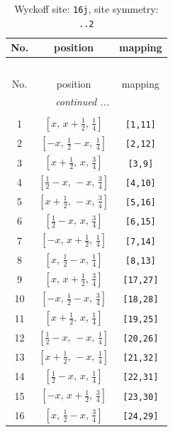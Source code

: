 \documentclass[fleqn,8pt]{jsarticle}
\begin{document}
\renewcommand{\arraystretch}{1.2}
\begin{longtable}{ccc}
\caption{Wyckoff site: {\tt 16j}, site symmetry: {\tt ..2}}
 \\
 \hline \hline
No. & position & mapping \\ \hline \endfirsthead

\multicolumn{2}{l}{\tablename\ \thetable{}} \\
 \hline \hline
No. & position & mapping \\ \hline \endhead

 \hline \hline
\multicolumn{2}{r}{\footnotesize\it continued ...} \\ \endfoot

 \hline \hline
\multicolumn{2}{r}{} \\ \endlastfoot

1 & $\left[ x,\, x + \frac{1}{2},\, \frac{1}{4} \right]$ & {\tt [1,11]} \\ \hline
2 & $\left[ - x,\, \frac{1}{2} - x,\, \frac{1}{4} \right]$ & {\tt [2,12]} \\ \hline
3 & $\left[ x + \frac{1}{2},\, x,\, \frac{3}{4} \right]$ & {\tt [3,9]} \\ \hline
4 & $\left[ \frac{1}{2} - x,\, - x,\, \frac{3}{4} \right]$ & {\tt [4,10]} \\ \hline
5 & $\left[ x + \frac{1}{2},\, - x,\, \frac{3}{4} \right]$ & {\tt [5,16]} \\ \hline
6 & $\left[ \frac{1}{2} - x,\, x,\, \frac{3}{4} \right]$ & {\tt [6,15]} \\ \hline
7 & $\left[ - x,\, x + \frac{1}{2},\, \frac{1}{4} \right]$ & {\tt [7,14]} \\ \hline
8 & $\left[ x,\, \frac{1}{2} - x,\, \frac{1}{4} \right]$ & {\tt [8,13]} \\ \hline
9 & $\left[ x,\, x + \frac{1}{2},\, \frac{3}{4} \right]$ & {\tt [17,27]} \\ \hline
10 & $\left[ - x,\, \frac{1}{2} - x,\, \frac{3}{4} \right]$ & {\tt [18,28]} \\ \hline
11 & $\left[ x + \frac{1}{2},\, x,\, \frac{1}{4} \right]$ & {\tt [19,25]} \\ \hline
12 & $\left[ \frac{1}{2} - x,\, - x,\, \frac{1}{4} \right]$ & {\tt [20,26]} \\ \hline
13 & $\left[ x + \frac{1}{2},\, - x,\, \frac{1}{4} \right]$ & {\tt [21,32]} \\ \hline
14 & $\left[ \frac{1}{2} - x,\, x,\, \frac{1}{4} \right]$ & {\tt [22,31]} \\ \hline
15 & $\left[ - x,\, x + \frac{1}{2},\, \frac{3}{4} \right]$ & {\tt [23,30]} \\ \hline
16 & $\left[ x,\, \frac{1}{2} - x,\, \frac{3}{4} \right]$ & {\tt [24,29]} \\
\end{longtable}
\end{document}
